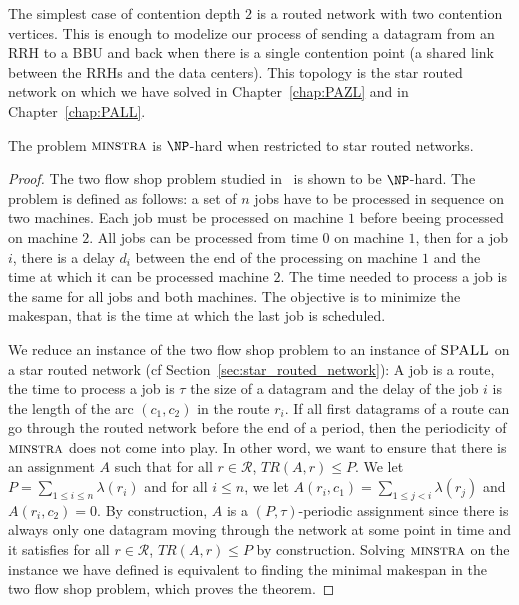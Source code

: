 The simplest case of contention depth $2$ is a routed network with two contention vertices. 
This is enough to modelize our process of sending a datagram from an RRH to a BBU and back when
there is a single contention point (a shared link between the RRHs and the data centers). 
This topology is the star routed network on which we have solved \pazl in Chapter~\ref{chap:PAZL} and \pall in Chapter~\ref{chap:PALL}.


 \begin{theorem}\label{th:spallHard}
The problem $\textsc{minstra}$ is $\NP$-hard when restricted to star routed networks.
\end{theorem}
\begin{proof}
The two flow shop problem studied in~\cite{yu2004minimizing} is shown to be $\NP$-hard. The problem is defined as follows: a set of $n$ jobs have to be processed in sequence on two machines. Each job must be processed on machine $1$ before beeing processed on machine $2$. All jobs can be processed from time $0$ on machine $1$, then for a job $i$, there is a delay $d_i$ between the end of the processing on machine $1$ and the time at which it can be processed machine $2$.  The time needed to process a job is the same for all jobs and both machines. The objective is to minimize the makespan, that is the time at which the last job is scheduled.

We reduce an instance of the two flow shop problem to an instance of $\textsc{SPALL}$ on a star routed network (cf Section~\ref{sec:star_routed_network}): A job is a route, the time to process a job is $\tau$ the size of a datagram and 
 the delay of the job $i$ is the length of the arc $(c_1,c_2)$ in the route $r_i$. If all first datagrams of a route can 
 go through the routed network before the end of a period, then the periodicity of $\textsc{minstra}$ does not come into play.
 In other word, we want to ensure that there is an assignment $A$ such that for all $r \in \mathcal{R}$, $TR(A,r) \leq P$.
 We let $P = \sum_{1 \leq i\leq n} \lambda(r_i)$ and for all $i \leq n$, we let $A(r_i,c_1) = \sum_{1 \leq j < i} \lambda(r_j)$ and $A(r_i,c_2)=0$. By construction, $A$ is a $(P,\tau)$-periodic assignment since there is always only one datagram
 moving through the network at some point in time and it satisfies  for all $r \in \mathcal{R}$, $TR(A,r) \leq P$ by construction.
 Solving $\textsc{minstra}$ on the instance we have defined is equivalent to finding the minimal makespan in the two flow shop problem, which proves the theorem.
\end{proof}


